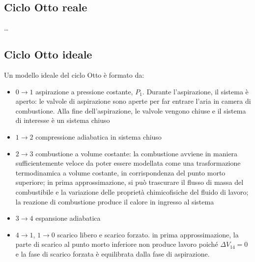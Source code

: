 \documentclass[letterpaper,10pt,italian]{jupyterBook}
\begin{document}
\subsection{Ciclo Otto reale}
\label{\detokenize{ch/thermodynamics/heat-engine-otto:ciclo-otto-reale}}
\sphinxAtStartPar
…


\subsection{Ciclo Otto ideale}
\label{\detokenize{ch/thermodynamics/heat-engine-otto:ciclo-otto-ideale}}
\sphinxAtStartPar
Un modello ideale del ciclo Otto è formato da:
\begin{itemize}
\item {} 
\sphinxAtStartPar
\(0 \rightarrow 1\) aspirazione a pressione costante, \(P_1\). Durante l’aspirazione, il sistema è aperto: le valvole di aspirazione sono aperte per far entrare l’aria in camera di combustione. Alla fine dell’aspirazione, le valvole vengono chiuse e il sistema di interesse è un sistema chiuso

\item {} 
\sphinxAtStartPar
\(1 \rightarrow 2\) compressione adiabatica in sistema chiuso

\item {} 
\sphinxAtStartPar
\(2 \rightarrow 3\) combustione a volume costante: la combustione avviene in maniera sufficientemente veloce da poter essere modellata come una trasformazione termodinamica a volume costante, in corrispondenza del punto morto superiore; in prima approssimazione, si può trascurare il flusso di massa del combustibile e la variazione delle proprietà chimico\sphinxhyphen{}fisiche del fluido di lavoro; la reazione di combustione produce il calore in ingresso al sistema

\item {} 
\sphinxAtStartPar
\(3 \rightarrow 4\) espansione adiabatica

\item {} 
\sphinxAtStartPar
\(4 \rightarrow 1\), \(1 \rightarrow 0\) scarico libero e scarico forzato.  in prima approssimazione, la parte di scarico al punto morto inferiore non produce lavoro poiché \(\Delta V_{14} = 0\) e la fase di scarico forzata è equilibrata dalla fase di aspirazione.

\end{itemize}
\end{document}
